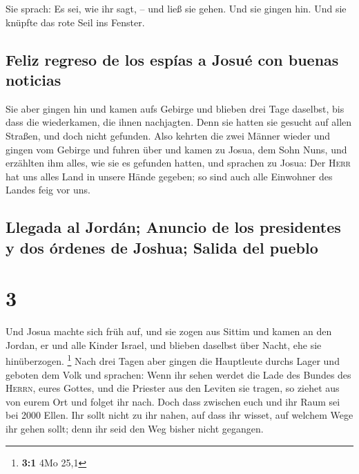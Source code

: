  Sie sprach: Es sei, wie ihr sagt, -- und ließ sie gehen.
Und sie gingen hin. Und sie knüpfte das rote Seil ins Fenster.

\hypertarget{feliz-regreso-de-los-espuxedas-a-josuuxe9-con-buenas-noticias}{%
\subsection{Feliz regreso de los espías a Josué con buenas
noticias}\label{feliz-regreso-de-los-espuxedas-a-josuuxe9-con-buenas-noticias}}

 Sie aber gingen hin und kamen aufs Gebirge und blieben
drei Tage daselbst, bis dass die wiederkamen, die ihnen nachjagten. Denn
sie hatten sie gesucht auf allen Straßen, und doch nicht gefunden.
 Also kehrten die zwei Männer wieder und gingen vom
Gebirge und fuhren über und kamen zu Josua, dem Sohn Nuns, und erzählten
ihm alles, wie sie es gefunden hatten,  und sprachen zu
Josua: Der \textsc{Herr} hat uns alles Land in unsere Hände gegeben; so
sind auch alle Einwohner des Landes feig vor uns.

\hypertarget{llegada-al-jorduxe1n-anuncio-de-los-presidentes-y-dos-uxf3rdenes-de-joshua-salida-del-pueblo}{%
\subsection{Llegada al Jordán; Anuncio de los presidentes y dos órdenes
de Joshua; Salida del
pueblo}\label{llegada-al-jorduxe1n-anuncio-de-los-presidentes-y-dos-uxf3rdenes-de-joshua-salida-del-pueblo}}

\hypertarget{section-2}{%
\section{3}\label{section-2}}

 Und Josua machte sich früh auf, und sie zogen aus Sittim
und kamen an den Jordan, er und alle Kinder Israel, und blieben daselbst
über Nacht, ehe sie hinüberzogen. \footnote{\textbf{3:1} 4Mo 25,1}
 Nach drei Tagen aber gingen die Hauptleute durchs Lager
 und geboten dem Volk und sprachen: Wenn ihr sehen werdet
die Lade des Bundes des \textsc{Herrn}, eures Gottes, und die Priester
aus den Leviten sie tragen, so ziehet aus von eurem Ort und folget ihr
nach.  Doch dass zwischen euch und ihr Raum sei bei 2000
Ellen. Ihr sollt nicht zu ihr nahen, auf dass ihr wisset, auf welchem
Wege ihr gehen sollt; denn ihr seid den Weg bisher nicht gegangen.


